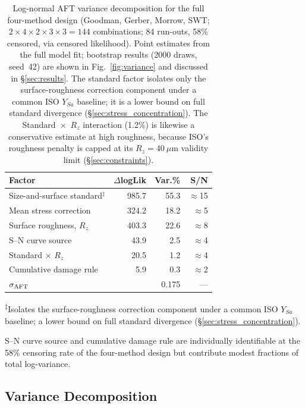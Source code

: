 \documentclass[twocolumn,12pt,a4paper]{article}
\begin{document}
\begin{table}[h]
\centering
\caption{Log-normal AFT variance decomposition for the full
four-method design (Goodman, Gerber, Morrow, SWT;
$2\times4\times2\times3\times3 = 144$ combinations; 84 run-outs,
58\% censored, via censored likelihood). Point estimates from the
full model fit; bootstrap results (2000 draws, seed~42) are shown
in Fig.~\ref{fig:variance} and discussed in \S\ref{sec:results}.
The standard factor isolates only the surface-roughness correction
component under a common ISO $Y_{Sa}$ baseline; it is a lower bound
on full standard divergence (\S\ref{sec:stress_concentration}). The
Standard~$\times$~$R_z$ interaction (1.2\%) is likewise a conservative
estimate at high roughness, because ISO's roughness penalty is capped
at its $R_z=40~\mu$m validity limit
(\S\ref{sec:constraints}).}
\label{tab:anova}
\footnotesize
\begin{tabular}{lrrr}
\toprule
Factor & $\Delta$logLik & Var.\% & S/N \\
\midrule
Size-and-surface standard$^\ddagger$ & 985.7 & 55.3 & $\approx$15 \\
Mean stress correction & 324.2 & 18.2 & $\approx$5 \\
Surface roughness, $R_z$    & 403.3 & 22.6 & $\approx$8 \\
S--N curve source      & 43.9 &  2.5 &  $\approx$4 \\
Standard $\times$ $R_z$     & 20.5 &  1.2 &  $\approx$4 \\
Cumulative damage rule &  5.9 &  0.3 &  $\approx$2 \\
\midrule
$\sigma_{\rm AFT}$          &        & 0.175 & --- \\
\bottomrule
\end{tabular}

\medskip\noindent\textsuperscript{$\ddagger$}Isolates the surface-roughness
correction component under a common ISO $Y_{Sa}$ baseline; a lower bound on
full standard divergence (\S\ref{sec:stress_concentration}).

\noindent S--N curve source and cumulative damage rule are individually
identifiable at the 58\% censoring rate of the four-method design but
contribute modest fractions of total log-variance.
\end{table}

\subsection{Variance Decomposition}
\end{document}
